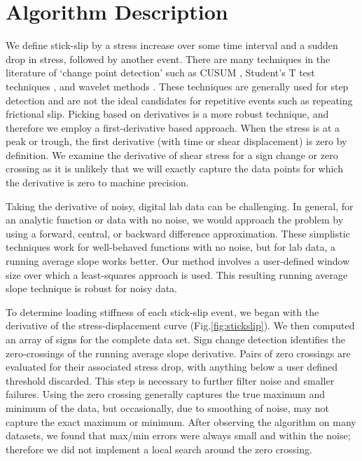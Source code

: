 \section{Algorithm Description}

We define stick-slip by a stress increase over some time interval and a sudden
drop in stress, followed by another event.  There are many techniques in the
literature of `change point detection' such as CUSUM \cite{page1954continuous},
Student's T test techniques \cite{buishand1982some}, and wavelet methods
\cite{raimondo2004peaks}.  These techniques are generally used for step
detection and are not the ideal candidates for repetitive events such as
repeating frictional slip.  Picking based on derivatives is a more robust
technique, and therefore we employ a first-derivative based approach.  When the
stress is at a peak or trough, the first derivative (with time or shear
displacement) is zero by definition.  We examine the derivative of shear stress
for a sign change or zero crossing as it is unlikely that we will exactly
capture the data points for which the derivative is zero to machine precision.

Taking the derivative of noisy, digital lab data can be challenging.  In
general, for an analytic function or data with no noise, we would approach the
problem by using a forward, central, or backward difference approximation.
These simplistic techniques work for well-behaved functions with no noise, but
for lab data, a running average slope works better. Our method involves a
user-defined window size over which a least-squares approach is used.  This
resulting running average slope technique is robust for noisy data.

To determine loading stiffness of each stick-slip event, we began with the
derivative of the stress-displacement curve (Fig.\ref{fig:stickslip}). We then
computed an array of signs for the complete data set. Sign change detection
identifies the zero-crossings of the running average slope derivative.  Pairs of
zero crossings are evaluated for their associated stress drop, with anything
below a user defined threshold discarded.  This step is necessary to further
filter noise and smaller failures.  Using the zero crossing generally captures
the true maximum and minimum of the data, but occasionally, due to smoothing of
noise, may not capture the exact maximum or minimum.  After observing the
algorithm on many datasets, we found that max/min errors were always small and
within the noise; therefore we did not implement a local search around the zero
crossing.

